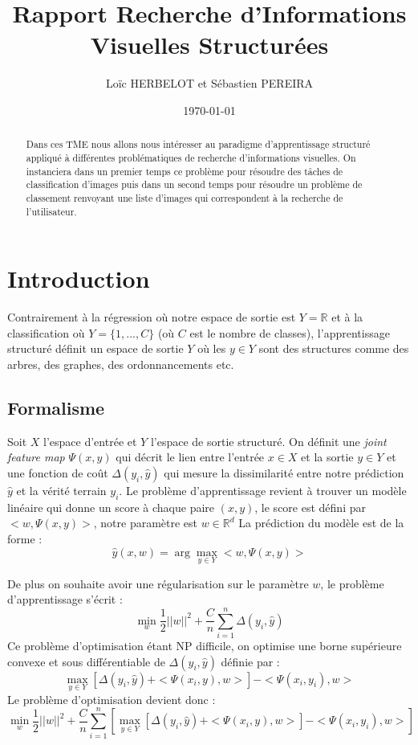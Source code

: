 \documentclass[a4paper]{article}
\title{Rapport Recherche d'Informations Visuelles Structurées }
\author{Loïc HERBELOT et Sébastien PEREIRA}
\date{\today}
\begin{document}
\maketitle

\begin{abstract}
Dans ces TME nous allons nous intéresser au paradigme d'apprentissage structuré appliqué à différentes problématiques de recherche d'informations visuelles. On instanciera dans un premier temps ce problème pour résoudre des tâches de classification d'images puis dans un second temps pour résoudre un problème de classement renvoyant une liste d'images qui correspondent à la recherche de l'utilisateur.
\end{abstract}

\section{Introduction}
Contrairement à la régression où notre espace de sortie est $Y = \mathbb{R}$ et à la classification où $Y = \{1, ..., C\}$ (où $C$ est le nombre de classes), l'apprentissage structuré définit un espace de sortie $Y$ où les $y \in Y$ sont des structures comme des arbres, des graphes, des ordonnancements etc.
\subsection{Formalisme}
Soit $X$ l'espace d'entrée et $Y$ l'espace de sortie structuré.
On définit une \textit{joint feature map} $\Psi(x,y)$ qui décrit le lien entre l'entrée $x \in X$ et la sortie $y \in Y$ et une fonction de coût $\Delta(y_i,\hat{y})$ qui mesure la dissimilarité entre notre prédiction $\hat{y}$ et la vérité terrain $y_i$.
Le problème d'apprentissage revient à trouver un modèle linéaire qui donne un score à chaque paire $(x,y)$, le score est défini par $<w, \Psi(x,y)>$, notre paramètre est $w \in \mathbb{R}^d$
La prédiction du modèle est de la forme :
\begin{equation}
\hat{y}(x,w) = \arg\max_{y \in Y} <w, \Psi(x,y)>
\end{equation}

De plus on souhaite avoir une régularisation sur le paramètre $w$, le problème d'apprentissage s'écrit :
\begin{equation}
\min_{w} \frac{1}{2} {||w||}^2 + \frac{C}{n} \sum\limits_{i=1}^n \Delta(y_i, \hat{y})
\end{equation}
Ce problème d'optimisation étant NP difficile, on optimise une borne supérieure convexe et sous différentiable de $\Delta(y_i, \hat{y})$ définie par :
\begin{equation}
\max_{y \in Y} [\Delta(y_i, \hat{y}) + <\Psi(x_i,y),w>]  - <\Psi(x_i,y_i),w>
\end{equation}
Le problème d'optimisation devient donc :
\begin{equation}
\min_{w} \frac{1}{2} {||w||}^2 + \frac{C}{n} \sum\limits_{i=1}^n [ \max_{y \in Y} [\Delta(y_i, \hat{y}) + <\Psi(x_i,y),w>]  - <\Psi(x_i,y_i),w>]
\end{equation}
\end{document}
